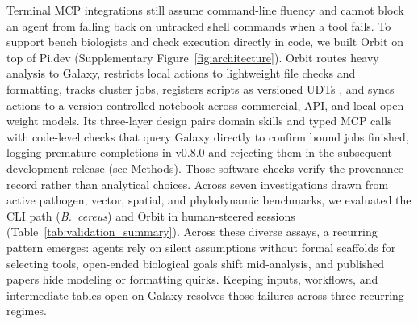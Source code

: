 \documentclass[11pt,letterpaper]{article}
\newcommand{\tool}[1]{\textsf{#1}}
\begin{document}
Terminal MCP integrations still assume command-line fluency and cannot block an agent from falling back on untracked shell commands when a tool fails. To support bench biologists and check execution directly in code, we built \tool{Orbit} on top of \tool{Pi.dev} \cite{pidev2026} (Supplementary Figure~\ref{fig:architecture}). \tool{Orbit} routes heavy analysis to Galaxy, restricts local actions to lightweight file checks and formatting, tracks cluster jobs, registers scripts as versioned UDTs \cite{galaxyudt2026}, and syncs actions to a version-controlled notebook across commercial, API, and local open-weight models. Its three-layer design pairs domain skills and typed MCP calls with code-level checks that query Galaxy directly to confirm bound jobs finished, logging premature completions in v0.8.0 and rejecting them in the subsequent development release (see Methods). Those software checks verify the provenance record rather than analytical choices. Across seven investigations drawn from active pathogen, vector, spatial, and phylodynamic benchmarks, we evaluated the CLI path (\textit{B.\ cereus}) and \tool{Orbit} in human-steered sessions (Table~\ref{tab:validation_summary}). Across these diverse assays, a recurring pattern emerges: agents rely on silent assumptions without formal scaffolds for selecting tools, open-ended biological goals shift mid-analysis, and published papers hide modeling or formatting quirks. Keeping inputs, workflows, and intermediate tables open on Galaxy resolves those failures across three recurring regimes.
\end{document}
